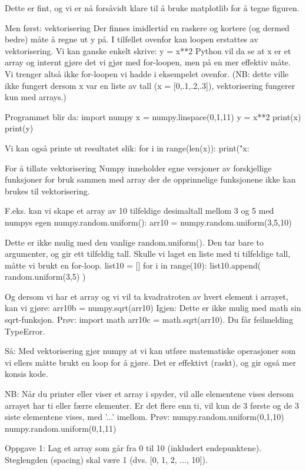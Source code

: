 Dette er fint, og vi er nå forsåvidt klare til å bruke matplotlib for å tegne figuren.


Men først: vektorisering
Der finnes imidlertid en raskere og kortere (og dermed bedre) måte å regne ut y på.
I tilfellet ovenfor kan loopen erstattes av vektorisering. 
Vi kan ganske enkelt skrive:
y = x**2
Python vil da se at x er et array og internt gjøre det vi gjør med for-loopen, 
men på en mer effektiv måte.
Vi trenger altså ikke for-loopen vi hadde i eksempelet ovenfor. 
(NB: dette ville ikke fungert dersom x var en liste av tall (x = [0,.1,.2,.3]), 
vektorisering fungerer kun med arrays.) 



Programmet blir da:
import numpy
x = numpy.linspace(0,1,11)
y = x**2
print(x)
print(y)

Vi kan også printe ut resultatet slik:
for i in range(len(x)):
    print("x:%


For å tillate vektorisering
Numpy inneholder egne versjoner av forskjellige funksjoner for bruk sammen med array 
der de opprinnelige funksjonene ikke kan brukes til vektorisering. 

F.eks. kan vi skape et array av 10 tilfeldige desimaltall mellom 3 og 5 med numpys 
egen numpy.random.uniform(): 
arr10 = numpy.random.uniform(3,5,10)

Dette er ikke mulig med den vanlige random.uniform(). 
Den tar bare to argumenter, og gir ett tilfeldig tall. 
Skulle vi laget en liste med ti tilfeldige tall, måtte vi brukt en for-loop. 
list10 = []
for i in range(10): 
    list10.append( random.uniform(3,5) ) 


Og dersom vi har et array og vi vil ta kvadratroten av hvert element i arrayet, 
kan vi gjøre: 
arr10b = numpy.sqrt(arr10)
Igjen: Dette er ikke mulig med math sin sqrt-funksjon. 
Prøv: 
import math 
arr10c = math.sqrt(arr10). 
Du får feilmelding TypeError. 


Så: Med vektorisering gjør numpy at vi kan utføre matematiske operasjoner 
som vi ellers måtte brukt en loop for å gjøre. 
Det er effektivt (raskt), og gir også mer konsis kode. 


NB: Når du printer eller viser et array i spyder, vil alle elementene vises dersom arrayet 
har ti eller færre elementer.
Er det flere enn ti, vil kun de 3 første og de 3 siste elementene vises, med '...' imellom.
Prøv: 
numpy.random.uniform(0,1,10)
numpy.random.uniform(0,1,11)



Oppgave 1: Lag et array som går fra 0 til 10 (inkludert endepunktene). 
Steglengden (spacing) skal være 1  (dvs. [0, 1, 2, ..., 10]). 


